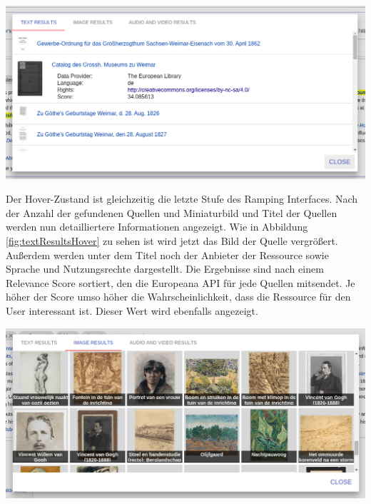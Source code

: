 \begin{minipage}{\linewidth}
	\centering
	\vspace*{0.5cm}
	\includegraphics[width=\linewidth]{Bilder/app-screenshots/text-results-hovered.png}
	\label{fig:textResultsHover}
	\vspace*{0.5cm}
 \end{minipage}

 Der Hover-Zustand ist gleichzeitig die letzte Stufe des Ramping Interfaces. Nach der Anzahl der gefundenen Quellen und Miniaturbild und Titel der Quellen werden nun detailliertere Informationen angezeigt. Wie in Abbildung \ref{fig:textResultsHover} zu sehen ist wird jetzt das Bild der Quelle vergrößert. Außerdem werden unter dem Titel noch der Anbieter der Ressource sowie Sprache und Nutzungsrechte dargestellt. Die Ergebnisse sind nach einem Relevance Score sortiert, den die Europeana API für jede Quellen mitsendet. Je höher der Score umso höher die Wahrscheinlichkeit, dass die Ressource für den User interessant ist. Dieser Wert wird ebenfalls angezeigt. 

 \begin{minipage}{\linewidth}
	\centering
	\vspace*{0.5cm}
	\includegraphics[width=\linewidth]{Bilder/app-screenshots/image-results.png}
	\label{fig:imageResults}
	\vspace*{0.5cm}
 \end{minipage}

